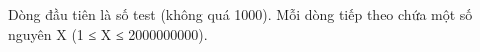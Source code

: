 Dòng đầu tiên là số test (không quá 1000). Mỗi dòng tiếp theo chứa một số nguyên X (1 ≤ X ≤ 2000000000).